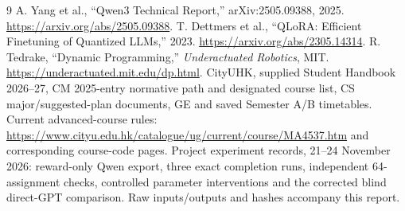 \documentclass{article}
\begin{document}
\begin{thebibliography}{9}
\footnotesize\setlength{\itemsep}{0pt}\setlength{\parsep}{0pt}
A. Yang et al., ``Qwen3 Technical Report,'' arXiv:2505.09388, 2025. \url{https://arxiv.org/abs/2505.09388}.
T. Dettmers et al., ``QLoRA: Efficient Finetuning of Quantized LLMs,'' 2023. \url{https://arxiv.org/abs/2305.14314}.
R. Tedrake, ``Dynamic Programming,'' \emph{Underactuated Robotics}, MIT. \url{https://underactuated.mit.edu/dp.html}.
CityUHK, supplied Student Handbook 2026--27, CM 2025-entry normative path and designated course list, CS major/suggested-plan documents, GE and saved Semester A/B timetables. Current advanced-course rules: \url{https://www.cityu.edu.hk/catalogue/ug/current/course/MA4537.htm} and corresponding course-code pages.
Project experiment records, 21--24 November 2026: reward-only Qwen export, three exact completion runs, independent 64-assignment checks, controlled parameter interventions and the corrected blind direct-GPT comparison. Raw inputs/outputs and hashes accompany this report.
\end{thebibliography}
\end{document}

